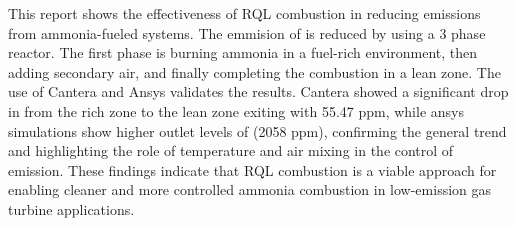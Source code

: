 This report shows the effectiveness of RQL combustion in reducing  emissions from ammonia-fueled systems. The emmision of  is reduced by using a 3 phase reactor. The first phase is burning ammonia in a fuel-rich environment, then adding secondary air, and finally completing the combustion in a lean zone. The use of Cantera and Ansys validates the results. Cantera showed a significant drop in  from the rich zone to the lean zone exiting with 55.47 ppm, while ansys simulations show higher outlet levels of  (2058 ppm), confirming the general trend and highlighting the role of temperature and air mixing in the control of emission. These findings indicate that RQL combustion is a viable approach for enabling cleaner and more controlled ammonia combustion in low-emission gas turbine applications.